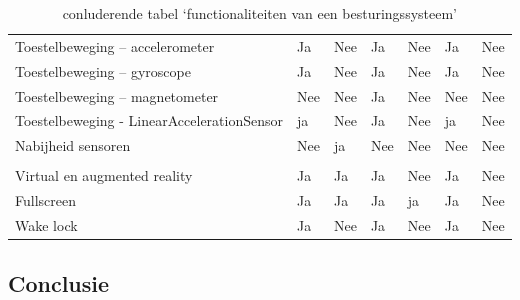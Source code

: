 \begin{table}[]
\begin{tabular}{p{6cm}p{13mm}p{13mm}p{13mm}p{13mm}p{13mm}p{13mm}}
			   Toestelbeweging – accelerometer & \cellcolor{green!40} Ja  & \cellcolor{red!50} Nee & \cellcolor{green!40} Ja  & \cellcolor{red!50} Nee& \cellcolor{green!40} Ja & \cellcolor{red!50} Nee \\
			   
			   Toestelbeweging – gyroscope & \cellcolor{green!40} Ja  & \cellcolor{red!50} Nee & \cellcolor{green!40} Ja  & \cellcolor{red!50} Nee& \cellcolor{green!40} Ja & \cellcolor{red!50} Nee \\
			   
			    Toestelbeweging – magnetometer & \cellcolor{red!50} Nee  & \cellcolor{red!50} Nee & \cellcolor{green!40} Ja  & \cellcolor{red!50} Nee& \cellcolor{red!50} Nee & \cellcolor{red!50} Nee \\
			   
			   Toestelbeweging - LinearAccelerationSensor & \cellcolor{green!40} ja  & \cellcolor{red!50} Nee & \cellcolor{green!40} Ja  & \cellcolor{red!50} Nee& \cellcolor{green!40} ja  & \cellcolor{red!50} Nee \\
			   
			   Nabijheid sensoren &  \cellcolor{red!50} Nee  &  \cellcolor{green!40} ja  &  \cellcolor{red!50} Nee  & \cellcolor{red!50} Nee &  \cellcolor{red!50} Nee &  \cellcolor{red!50} Nee \\
			   
			   &  & &  &  &  &  \\
			   
			    Virtual en augmented reality  & \cellcolor{green!40} Ja  & \cellcolor{green!40} Ja & \cellcolor{green!40} Ja & \cellcolor{red!50} Nee  & \cellcolor{green!40} Ja & \cellcolor{red!50} Nee \\
			    
			     Fullscreen & \cellcolor{green!40} Ja  & \cellcolor{green!40} Ja & \cellcolor{green!40} Ja & \cellcolor{green!40} ja   & \cellcolor{green!40} Ja & \cellcolor{red!50} Nee \\
			   
			   Wake lock & \cellcolor{green!40} Ja  &  \cellcolor{red!50} Nee & \cellcolor{green!40} Ja  & \cellcolor{red!50} Nee & \cellcolor{green!40} Ja &  \cellcolor{red!50} Nee \\

		\end{tabular}	
		\caption{conluderende tabel ‘functionaliteiten van een besturingssysteem’}
	\end{table}

\clearpage
\subsection{Conclusie}

